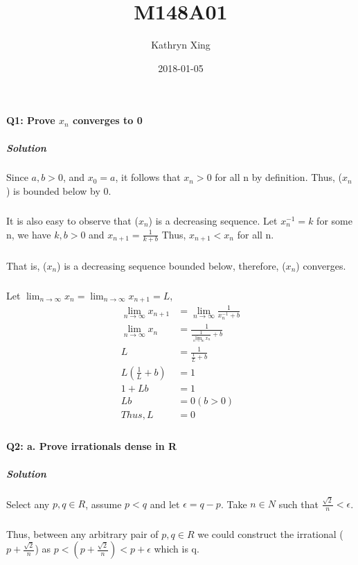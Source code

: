 \documentclass{article}
\title{M148A01}
\date{2018-01-05}
\author{Kathryn Xing}
\begin{document}
\paragraph{Q1: Prove {$x_n$} converges to 0}
\subparagraph{Solution}
Since $a, b > 0$, and $x_0 = a$, it follows that $x_n > 0$ for all n by definition. Thus, ($x_n$) is bounded below by 0.
\subparagraph{}
It is also easy to observe that ($x_n$) is a decreasing sequence.
Let $x^{-1}_n = k$ for some n, we have $k, b > 0$ and 
$ x_{n+1} = \frac{1}{k+b}$
Thus, $x_{n+1} < x_n$ for all n. 
\subparagraph{}
That is, ($x_n$) is a decreasing sequence bounded below, therefore, ($x_n$) converges.
\subparagraph{}
Let $\lim_{n\to\infty} x_n = \lim_{n\to\infty} x_{n+1} = L$, 
\begin{align*}
\lim_{n\to\infty} x_{n+1} &= \lim_{n\to\infty} \frac{1}{x^{-1}_{n} + b}\\
\lim_{n\to\infty} x_{n} &= \frac{1}{\frac{1}{\lim_{n\to\infty} x_n} + b}\\
L &= \frac{1}{\frac{1}{L} + b}\\
L (\frac{1}{L} + b) &= 1\\
1 + Lb &= 1\\
Lb &= 0   (b > 0)\\
Thus, L &= 0\\
\end{align*}

\paragraph{Q2: a. Prove irrationals dense in R}
\subparagraph{Solution}
Select any $p, q \in R$, assume $p < q$ and let $\epsilon = q - p$. Take $n \in N$ such that $\frac{\sqrt{2}}{n} < \epsilon$. 
\subparagraph{}
Thus, between any arbitrary pair of $p, q \in R$ we could construct the irrational ($p + \frac{\sqrt{2}}{n}$) as $p < (p + \frac{\sqrt{2}}{n}) < p + \epsilon $ which is q.
\end{document}
